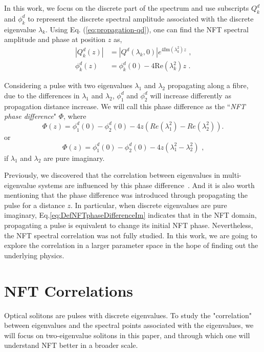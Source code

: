 \documentclass[9pt,twocolumn,twoside]{osajnl}
\begin{document}
In this work, we focus on the discrete part of the spectrum and use subscripts $Q^d_k$ and $\phi^d_k$ to represent the discrete spectral amplitude associated with the discrete eigenvalue $\lambda_k$. Using Eq. (\ref{eq:propagation-qd}), one can find the NFT spectral amplitude and phase at position $z$ as,
\begin{subequations}
    \begin{align}
        |Q^d_k(z)| &= |Q^{d}(\lambda_k,0)|e^{4\text{Im}(\lambda_k^2)z} \text{ ,}\\
        \phi^d_k(z) &= \phi^d_k(0)-4\text{Re}(\lambda_k^2)z \text{ .}
    \end{align}
\end{subequations}

Considering a pulse with two eigenvalues $\lambda_1$ and $\lambda_2$ propagating along a fibre, due to the differences in $\lambda_1$ and $\lambda_2$, $\phi^d_1$ and $\phi^d_2$ will increase differently as propagation distance increase. We will call this phase difference as the ``\emph{NFT phase difference}" $\Phi$, where
\begin{equation}
    \Phi(z) = \phi^d_1(0)-\phi^d_2(0)-4z(Re(\lambda^2_1)-Re(\lambda^2_2)) \text{.}
    \label{eq:DefNFTphaseDifference}
\end{equation}
or
\begin{equation}
    \Phi(z) = \phi^d_1(0)-\phi^d_2(0)-4z(\lambda^2_1-\lambda^2_2) \text{ ,}
    \label{eq:DefNFTphaseDifferenceIm}
\end{equation}
if $\lambda_1$ and $\lambda_2$ are pure imaginary.

Previously, we discovered that the correlation between eigenvalues in multi-eigenvalue systems are influenced by this phase difference~\cite{zhang_correlated_2019}. And it is also worth mentioning that the phase difference was introduced through propagating the pulse for a distance $z$. 
In particular, when discrete eigenvalues are pure imaginary, 
Eq.\ref{eq:DefNFTphaseDifferenceIm} indicates that in the NFT domain, propagating a pulse is equivalent to change its initial NFT phase. Nevertheless, the NFT spectral correlation was not fully studied. In this work, we are going to explore the correlation in a larger parameter space in the hope of finding out the underlying physics.

\section{NFT Correlations}
\label{sec:NFTSpectralCovariances}
Optical solitons are pulses with discrete eigenvalues. To study the "correlation" between eigenvalues and the spectral points associated with the eigenvalues, we will focus on two-eigenvalue solitons in this paper, and through which one will understand NFT better in a broader scale.
\end{document}
